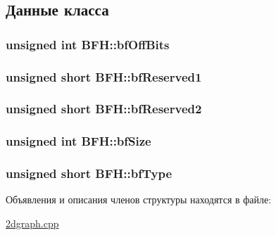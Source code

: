 \subsection{Данные класса}
\hypertarget{struct_b_f_h_a44d5b4c0ff8c1aa71b6d850f084e8369}{
\subsubsection[{bf\+Off\+Bits}]{\setlength{\rightskip}{0pt plus 5cm}unsigned int B\+F\+H\+::bf\+Off\+Bits}}\label{struct_b_f_h_a44d5b4c0ff8c1aa71b6d850f084e8369}
\hypertarget{struct_b_f_h_a7f8fa3405df38c43db75c5a67c4d415b}{
\subsubsection[{bf\+Reserved1}]{\setlength{\rightskip}{0pt plus 5cm}unsigned short B\+F\+H\+::bf\+Reserved1}}\label{struct_b_f_h_a7f8fa3405df38c43db75c5a67c4d415b}
\hypertarget{struct_b_f_h_abcb1c97de35b0a7728541813c2a54365}{
\subsubsection[{bf\+Reserved2}]{\setlength{\rightskip}{0pt plus 5cm}unsigned short B\+F\+H\+::bf\+Reserved2}}\label{struct_b_f_h_abcb1c97de35b0a7728541813c2a54365}
\hypertarget{struct_b_f_h_a1c55e1c73aa5af7783c7876c0413023c}{
\subsubsection[{bf\+Size}]{\setlength{\rightskip}{0pt plus 5cm}unsigned int B\+F\+H\+::bf\+Size}}\label{struct_b_f_h_a1c55e1c73aa5af7783c7876c0413023c}
\hypertarget{struct_b_f_h_ada9538ad85cd832a97515f2b6af7e732}{
\subsubsection[{bf\+Type}]{\setlength{\rightskip}{0pt plus 5cm}unsigned short B\+F\+H\+::bf\+Type}}\label{struct_b_f_h_ada9538ad85cd832a97515f2b6af7e732}


Объявления и описания членов структуры находятся в файле\+:\begin{DoxyCompactItemize}
\item 
\hyperlink{2dgraph_8cpp}{2dgraph.\+cpp}\end{DoxyCompactItemize}
